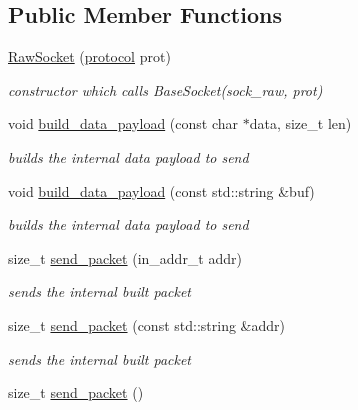 \subsection*{Public Member Functions}
\begin{CompactItemize}
\item 
\hyperlink{classsocketpp_1_1RawSocket_1a77e11388869bc70457efb75cd40b82}{RawSocket} (\hyperlink{namespacesocketpp_2969678def1c6c8cb4102802ca82e2cf}{protocol} prot)
\begin{CompactList}\small\item\em constructor which calls BaseSocket(sock\_\-raw, prot) \item\end{CompactList}\item 
void \hyperlink{classsocketpp_1_1RawSocket_99ea2415525269d24ba088a58d62abdd}{build\_\-data\_\-payload} (const char $\ast$data, size\_\-t len)
\begin{CompactList}\small\item\em builds the internal data payload to send \item\end{CompactList}\item 
void \hyperlink{classsocketpp_1_1RawSocket_a5e01f4dec94dbbef1c122ce4d7ed4ad}{build\_\-data\_\-payload} (const std::string \&buf)
\begin{CompactList}\small\item\em builds the internal data payload to send \item\end{CompactList}\item 
size\_\-t \hyperlink{classsocketpp_1_1RawSocket_5c812c1bf584f40c3fc6263a8014395b}{send\_\-packet} (in\_\-addr\_\-t addr)
\begin{CompactList}\small\item\em sends the internal built packet \item\end{CompactList}\item 
size\_\-t \hyperlink{classsocketpp_1_1RawSocket_6dfb29dbfedf61d8f082dc1893320d42}{send\_\-packet} (const std::string \&addr)
\begin{CompactList}\small\item\em sends the internal built packet \item\end{CompactList}\item 
size\_\-t \hyperlink{classsocketpp_1_1RawSocket_e987bb77fd3ac6d0e99b5311ff81c1ea}{send\_\-packet} ()

\end{CompactItemize}
